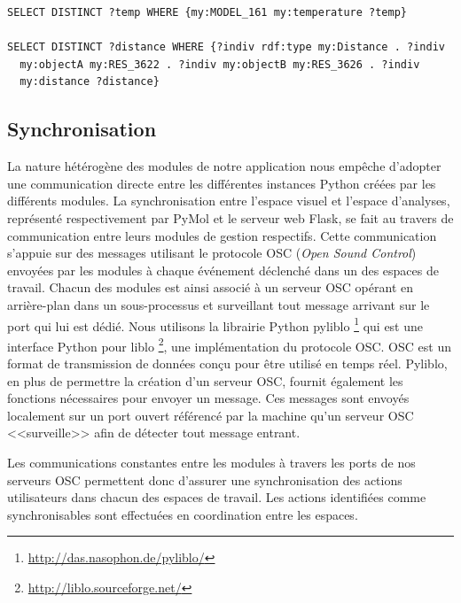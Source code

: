 \begin{lstlisting}[language=XML, caption=Deux requêtes SPARQL : 1. Accès à la température d'un modèle 2. Accès à la distance entre deux résidus, label=sparql_simple_vs_complexe]
SELECT DISTINCT ?temp WHERE {my:MODEL_161 my:temperature ?temp}

SELECT DISTINCT ?distance WHERE {?indiv rdf:type my:Distance . ?indiv 
  my:objectA my:RES_3622 . ?indiv my:objectB my:RES_3626 . ?indiv 
  my:distance ?distance}
\end{lstlisting}

\subsection{Synchronisation}

La nature hétérogène des modules de notre application nous empêche d'adopter une communication directe entre les différentes instances Python créées par les différents modules. La synchronisation entre l'espace visuel et l'espace d'analyses, représenté respectivement par PyMol et le serveur web Flask, se fait au travers de communication entre leurs modules de gestion respectifs. Cette communication s'appuie sur des messages utilisant le protocole OSC (\textit{Open Sound Control}) envoyées par les modules à chaque événement déclenché dans un des espaces de travail. Chacun des modules est ainsi associé à un serveur OSC opérant en arrière-plan dans un sous-processus et surveillant tout message arrivant sur le port qui lui est dédié. Nous utilisons la librairie Python pyliblo \footnote{\url{http://das.nasophon.de/pyliblo/}} qui est une interface Python pour liblo \footnote{\url{http://liblo.sourceforge.net/}}, une implémentation du protocole OSC. OSC est un format de transmission de données conçu pour être utilisé en temps réel. Pyliblo, en plus de permettre la création d'un serveur OSC, fournit également les fonctions nécessaires pour envoyer un message. Ces messages sont envoyés localement sur un port ouvert référencé par la machine qu'un serveur OSC <<surveille>> afin de détecter tout message entrant.

Les communications constantes entre les modules à travers les ports de nos serveurs OSC permettent donc d'assurer une synchronisation des actions utilisateurs dans chacun des espaces de travail. Les actions identifiées comme synchronisables sont effectuées en coordination entre les espaces.

